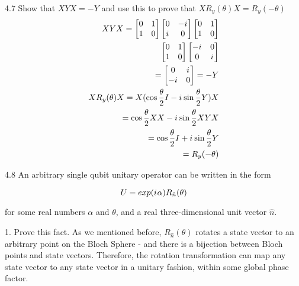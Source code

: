 \documentclass[12pt, letterpaper, twoside]{article}
\newcommand{\iu}{{i\mkern1mu}}
\newcommand{\halftheta}{\frac{\theta}{2}}
\newcommand{\twoXtwo}[4]{\begin{bmatrix}
    #1 & #3 \\
    #2 & #4
\end{bmatrix}}
\newcommand{\pauliX}{\twoXtwo{0}{1}{1}{0}}
\newcommand{\pauliY}{\twoXtwo{0}{\iu}{-\iu}{0}}
\begin{document}
4.7 Show that $XYX = -Y$ and use this to prove that $X R_y(\theta)X = R_y(-\theta)$
\begin{subequations}
	\begin{align}
		XYX = \pauliX\pauliY\pauliX                                   \\
		\pauliX\twoXtwo{-\iu}{0}{0}{\iu}                              \\
		= \twoXtwo{0}{-\iu}{\iu}{0} = -Y                              \\
		XR_y(\theta)X = X(\cos{\halftheta}I - \iu \sin{\halftheta}Y)X \\
		= \cos{\halftheta}XX - \iu \sin{\halftheta}XYX                \\
		= \cos{\halftheta}I +\iu \sin{\halftheta}Y                    \\
		= R_y(-\theta)
	\end{align}
\end{subequations}

4.8 An arbitrary single qubit unitary operator can be written in the form

$$
	U = exp(\iu \alpha)R_{\hat{n}}(\theta)
$$

for some real numbers $\alpha$ and $\theta$, and a real three-dimensional unit vector $\hat{n}$.

1. Prove this fact.
As we mentioned before, $R_{\hat{n}}(\theta)$ rotates a state vector to an arbitrary point on the Bloch Sphere - and there is a bijection between Bloch points and state vectors. Therefore, the rotation transformation can map any state vector to any state vector in a unitary fashion, within some global phase factor.
\end{document}
